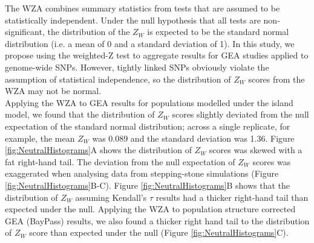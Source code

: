 \documentclass[10pt,twoside,lineno]{GSA_format}
\begin{document}
The WZA combines summary statistics from tests that are assumed to be statistically independent. Under the null hypothesis that all tests are non-significant, the distribution of the $Z_W$ is expected to be the standard normal distribution (i.e. a mean of 0 and a standard deviation of 1). In this study, we propose using the weighted-Z test to aggregate results for GEA studies applied to genome-wide SNPs. However, tightly linked SNPs obviously violate the assumption of statistical independence, so the distribution of $Z_W$ scores from the WZA may not be normal. \\

Applying the WZA to GEA results for populations modelled under the island model, we found that the distribution of $Z_W$ scores slightly deviated from the null expectation of the standard normal distribution; across a single replicate, for example, the mean $Z_W$ was 0.089 and the standard deviation was 1.36. Figure \ref{fig:NeutralHistograms}A shows the distribution of $Z_W$ scores was skewed with a fat right-hand tail.  The deviation from the null expectation of $Z_W$ scores was exaggerated when analysing data from stepping-stone simulations (Figure \ref{fig:NeutralHistograms}B-C). Figure \ref{fig:NeutralHistograms}B shows that the distribution of $Z_W$ assuming Kendall's $\tau$ results had a thicker right-hand tail than expected under the null. Applying the WZA to population structure corrected GEA (BayPass) results, we also found a thicker right hand tail to the distribution of $Z_W$ score than expected under the null (Figure \ref{fig:NeutralHistograms}C). \\
\end{document}
